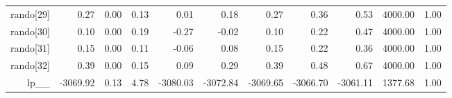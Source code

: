 \begin{table}[ht]
\begin{tabular}{rrrrrrrrrrr}
  rando[29] & 0.27 & 0.00 & 0.13 & 0.01 & 0.18 & 0.27 & 0.36 & 0.53 & 4000.00 & 1.00 \\ 
  rando[30] & 0.10 & 0.00 & 0.19 & -0.27 & -0.02 & 0.10 & 0.22 & 0.47 & 4000.00 & 1.00 \\ 
  rando[31] & 0.15 & 0.00 & 0.11 & -0.06 & 0.08 & 0.15 & 0.22 & 0.36 & 4000.00 & 1.00 \\ 
  rando[32] & 0.39 & 0.00 & 0.15 & 0.09 & 0.29 & 0.39 & 0.48 & 0.67 & 4000.00 & 1.00 \\ 
  lp\_\_ & -3069.92 & 0.13 & 4.78 & -3080.03 & -3072.84 & -3069.65 & -3066.70 & -3061.11 & 1377.68 & 1.00 \\ 
   \hline
\end{tabular}
\label{efit_tab}
\end{table}
